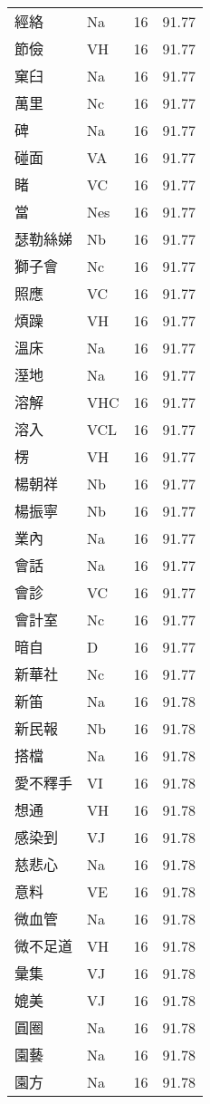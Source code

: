 \documentclass[twocolumn]{book}
\begin{document}
\begin{supertabular}{llrr}
經絡 & Na & 16 &  91.77\\
節儉 & VH & 16 &  91.77\\
窠臼 & Na & 16 &  91.77\\
萬里 & Nc & 16 &  91.77\\
碑 & Na & 16 &  91.77\\
碰面 & VA & 16 &  91.77\\
睹 & VC & 16 &  91.77\\
當 & Nes & 16 &  91.77\\
瑟勒絲娣 & Nb & 16 &  91.77\\
獅子會 & Nc & 16 &  91.77\\
照應 & VC & 16 &  91.77\\
煩躁 & VH & 16 &  91.77\\
溫床 & Na & 16 &  91.77\\
溼地 & Na & 16 &  91.77\\
溶解 & VHC & 16 &  91.77\\
溶入 & VCL & 16 &  91.77\\
楞 & VH & 16 &  91.77\\
楊朝祥 & Nb & 16 &  91.77\\
楊振寧 & Nb & 16 &  91.77\\
業內 & Na & 16 &  91.77\\
會話 & Na & 16 &  91.77\\
會診 & VC & 16 &  91.77\\
會計室 & Nc & 16 &  91.77\\
暗自 & D & 16 &  91.77\\
新華社 & Nc & 16 &  91.77\\
新笛 & Na & 16 &  91.78\\
新民報 & Nb & 16 &  91.78\\
搭檔 & Na & 16 &  91.78\\
愛不釋手 & VI & 16 &  91.78\\
想通 & VH & 16 &  91.78\\
感染到 & VJ & 16 &  91.78\\
慈悲心 & Na & 16 &  91.78\\
意料 & VE & 16 &  91.78\\
微血管 & Na & 16 &  91.78\\
微不足道 & VH & 16 &  91.78\\
彙集 & VJ & 16 &  91.78\\
媲美 & VJ & 16 &  91.78\\
圓圈 & Na & 16 &  91.78\\
園藝 & Na & 16 &  91.78\\
園方 & Na & 16 &  91.78\\

\end{supertabular}
\end{document}
